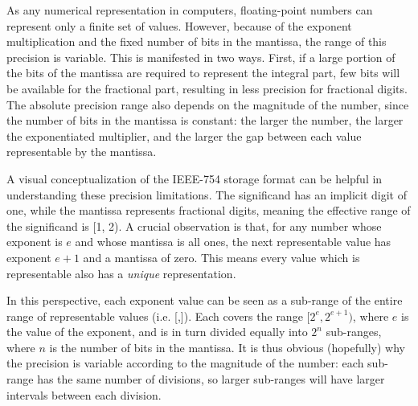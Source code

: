 As any numerical representation in computers, floating-point numbers can
represent only a finite set of values.  However, because of the exponent
multiplication and the fixed number of bits in the mantissa, the range of this
precision is variable.  This is manifested in two ways.  First, if a large
portion of the bits of the mantissa are required to represent the integral part,
few bits will be available for the fractional part, resulting in less precision
for fractional digits.  The absolute precision range also depends on the
magnitude of the number, since the number of bits in the mantissa is constant:
the larger the number, the larger the exponentiated multiplier, and the larger
the gap between each value representable by the mantissa.

A visual conceptualization of the IEEE-754 storage format can be helpful in
understanding these precision limitations.  The significand has an implicit
digit of one, while the mantissa represents fractional digits, meaning the
effective range of the significand is [1, 2).  A crucial observation is that,
for any number whose exponent is $e$ and whose mantissa is all ones, the next
representable value has exponent $e + 1$ and a mantissa of zero\footnotemark.
This means every value which is representable also has a \emph{unique}
representation.


In this perspective, each exponent value can be seen as a sub-range of the
entire range of representable values (i.e. [,]).
Each covers the range $[2^e,2^{e+1})$, where $e$ is the value of the exponent,
and is in turn divided equally into $2^n$ sub-ranges, where $n$ is the number of
bits in the mantissa\footnotemark.  It is thus obvious (hopefully) why the
precision is variable according to the magnitude of the number: each sub-range
has the same number of divisions, so larger sub-ranges will have larger
intervals between each division.

